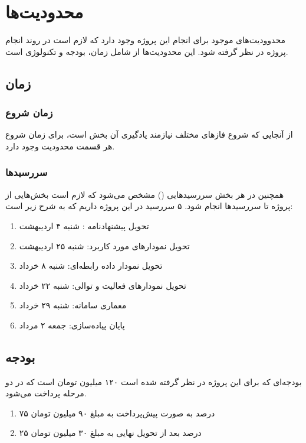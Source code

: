 \chapter{محدودیت‌ها}
محدوودیت‌های موجود برای انجام این پروژه وجود دارد که لازم است در روند انجام پروژه در نظر گرفته شود. این محدودیت‌ها از شامل زمان، بودجه و تکنولوژی است.
\section{زمان}
\subsection{زمان شروع}
از آنجایی که شروع فاز‌های مختلف نیاز‌مند یادگیری آن بخش است، برای زمان شروع هر قسمت محدودیت وجود دارد.
\subsection{سررسیدها}
همچنین در هر بخش سررسید‌هایی
()
مشخص می‌شود که لازم است بخش‌هایی از پروژه تا سررسید‌ها انجام شود. 
۵ سررسید در این پروژه داریم که به شرح زیر است:
\begin{enumerate}
	\item 
	تحویل پیشنهادنامه : شنبه ۴ اردیبهشت
	\item 
	تحویل نمودارهای مورد کاربرد: شنبه ۲۵ اردیبهشت
	\item 
	تحویل نمودار داده رابطه‌ای: شنبه ۸ خرداد
	\item
	تحویل نمودارهای فعالیت و توالی: شنبه ۲۲ خرداد
	\item
	معماری سامانه: شنبه ۲۹ خرداد
	\item
	پایان پیاده‌سازی: جمعه  ۲ مرداد
\end{enumerate}

\section{بودجه}
بودجه‌ای که برای این پروژه در نظر گرفته شده است ۱۲۰ میلیون تومان است که در دو مرحله پرداخت می‌شود.
\begin{enumerate}
	\item 
	۷۵ درصد به صورت پیش‌پرداخت به مبلغ ۹۰ میلیون تومان
	\item 
	۲۵ درصد بعد از تحویل نهایی به مبلغ ۳۰ میلیون تومان
\end{enumerate}

